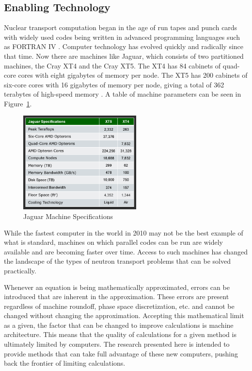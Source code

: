 \subsection{Enabling Technology}
Nuclear transport computation began in the age of run tapes and punch cards with widely used codes being written in advanced programming languages such as FORTRAN IV \cite{Fortran1998}. Computer technology has evolved quickly and radically since that time. Now there are machines like Jaguar, which consists of two partitioned machines, the Cray XT4 and the Cray XT5. The XT4 has 84 cabinets of quad-core cores with eight gigabytes of memory per node. The XT5 has 200 cabinets of six-core cores with 16 gigabytes of memory per node, giving a total of 362 terabytes of high-speed memory \cite{Sciences2010}. A table of machine parameters can be seen in Figure~\ref{fig:jaguar}. 

\begin{figure}[!h]
  \begin{center}
    \includegraphics [width=0.55\textwidth, height=0.35\textheight ] {jaguarSpecs09}
  \end{center}
  \caption{Jaguar Machine Specifications \cite{Sciences2010}}
  \label{fig:jaguar}
\end{figure}

While the fastest computer in the world in 2010 may not be the best example of what is standard, machines on which parallel codes can be run are widely available and are becoming faster over time. Access to such machines has changed the landscape of the types of neutron transport problems that can be solved practically. 

Whenever an equation is being mathematically approximated, errors can be introduced that are inherent in the approximation. These errors are present regardless of machine roundoff, phase space discretization, etc. and cannot be changed without changing the approximation. Accepting this mathematical limit as a given, the factor that can be changed to improve calculations is machine architecture. This means that the quality of calculations for a given method is ultimately limited by computers. The research presented here is intended to provide methods that can take full advantage of these new computers, pushing back the frontier of limiting calculations.

